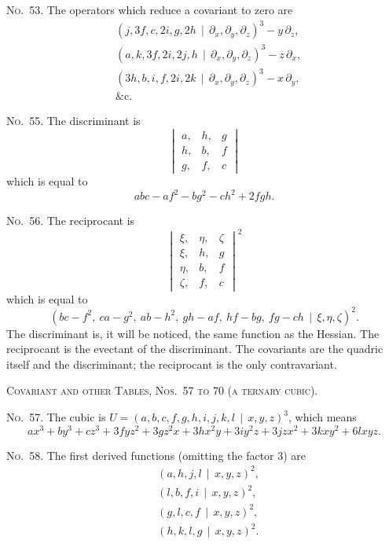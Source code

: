 \documentclass[11pt,a4paper]{article}
\begin{document}
\noindent\textsc{No.~53.} The operators which reduce a covariant to zero are
\begin{align*}
&(j, 3f, c, 2i, g, 2h \, \mid\, \partial_x, \partial_y, \partial_z)^3 - y\,\partial_z,\\
&(a, k, 3f, 2i, 2j, h \, \mid\, \partial_x, \partial_y, \partial_z)^3 - z\,\partial_x,\\
&(3h, b, i, f, 2i, 2k \, \mid\, \partial_x, \partial_y, \partial_z)^3 - x\,\partial_y,\\
&\text{\&c.}
\end{align*}

\noindent\textsc{No.~55.} The discriminant is
\[
\begin{vmatrix}
a, & h, & g \\
h, & b, & f \\
g, & f, & c
\end{vmatrix}
\]
which is equal to
\[abc - af^2 - bg^2 - ch^2 + 2fgh.\]

\noindent\textsc{No.~56.} The reciprocant is
\[
\begin{vmatrix}
\xi, & \eta, & \zeta \\
\xi, & h, & g \\
\eta, & b, & f \\
\zeta, & f, & c
\end{vmatrix}^2
\]
which is equal to
\[(bc-f^2,\ ca-g^2,\ ab-h^2,\ gh-af,\ hf-bg,\ fg-ch \, \mid\, \xi, \eta, \zeta)^2.\]
The discriminant is, it will be noticed, the same function as the Hessian.
The reciprocant is the evectant of the discriminant.
The covariants are the quadric itself and the discriminant; the reciprocant is the only contravariant.

\clearpage
\noindent\textsc{Covariant and other Tables, Nos.~57 to 70 (a ternary cubic).}

\noindent\textsc{No.~57.} The cubic is $U = (a, b, c, f, g, h, i, j, k, l \, \mid\, x, y, z)^3$,
which means
\[ax^3 + by^3 + cz^3 + 3fyz^2 + 3gz^2x + 3hx^2y + 3iy^2z + 3jzx^2 + 3kxy^2 + 6lxyz.\]

\noindent\textsc{No.~58.} The first derived functions (omitting the factor 3) are
\begin{align*}
&(a, h, j, l \, \mid\, x, y, z)^2,\\
&(l, b, f, i \, \mid\, x, y, z)^2,\\
&(g, l, c, f \, \mid\, x, y, z)^2,\\
&(h, k, l, g \, \mid\, x, y, z)^2.
\end{align*}
\end{document}
